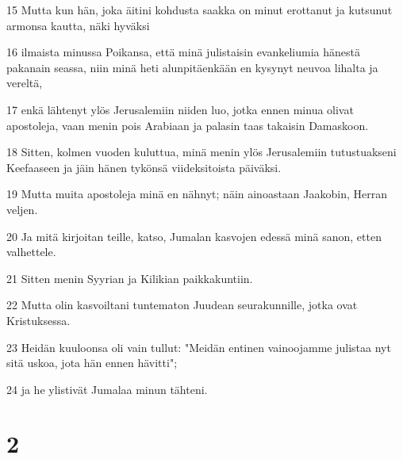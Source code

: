 \par 15 Mutta kun hän, joka äitini kohdusta saakka on minut erottanut ja kutsunut armonsa kautta, näki hyväksi
\par 16 ilmaista minussa Poikansa, että minä julistaisin evankeliumia hänestä pakanain seassa, niin minä heti alunpitäenkään en kysynyt neuvoa lihalta ja vereltä,
\par 17 enkä lähtenyt ylös Jerusalemiin niiden luo, jotka ennen minua olivat apostoleja, vaan menin pois Arabiaan ja palasin taas takaisin Damaskoon.
\par 18 Sitten, kolmen vuoden kuluttua, minä menin ylös Jerusalemiin tutustuakseni Keefaaseen ja jäin hänen tykönsä viideksitoista päiväksi.
\par 19 Mutta muita apostoleja minä en nähnyt; näin ainoastaan Jaakobin, Herran veljen.
\par 20 Ja mitä kirjoitan teille, katso, Jumalan kasvojen edessä minä sanon, etten valhettele.
\par 21 Sitten menin Syyrian ja Kilikian paikkakuntiin.
\par 22 Mutta olin kasvoiltani tuntematon Juudean seurakunnille, jotka ovat Kristuksessa.
\par 23 Heidän kuuloonsa oli vain tullut: "Meidän entinen vainoojamme julistaa nyt sitä uskoa, jota hän ennen hävitti";
\par 24 ja he ylistivät Jumalaa minun tähteni.

\chapter{2}

